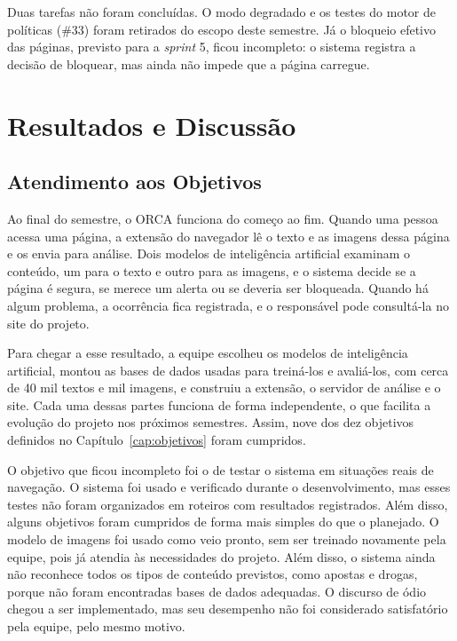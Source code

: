 \documentclass[
    12pt,           %
    oneside,        %
    a4paper,        %
    chapter=TITLE,  %
    english,        %
    brazil          %
]{abntex2}
\begin{document}
Duas tarefas não foram concluídas. O modo degradado e os testes do motor de
políticas (\#33) foram retirados do escopo deste semestre. Já o bloqueio
efetivo das páginas, previsto para a \textit{sprint} 5, ficou incompleto: o
sistema registra a decisão de bloquear, mas ainda não impede que a página
carregue.
\chapter{Resultados e Discussão}

\section{Atendimento aos Objetivos}

Ao final do semestre, o ORCA funciona do começo ao fim. Quando uma pessoa
acessa uma página, a extensão do navegador lê o texto e as imagens dessa
página e os envia para análise. Dois modelos de inteligência artificial
examinam o conteúdo, um para o texto e outro para as imagens, e o sistema
decide se a página é segura, se merece um alerta ou se deveria ser bloqueada.
Quando há algum problema, a ocorrência fica registrada, e o responsável pode
consultá-la no site do projeto.

Para chegar a esse resultado, a equipe escolheu os modelos de inteligência
artificial, montou as bases de dados usadas para treiná-los e avaliá-los, com
cerca de 40 mil textos e mil imagens, e construiu a extensão, o servidor de
análise e o site. Cada uma dessas partes funciona de forma independente, o que
facilita a evolução do projeto nos próximos semestres. Assim, nove dos dez
objetivos definidos no Capítulo~\ref{cap:objetivos} foram cumpridos.

O objetivo que ficou incompleto foi o de testar o sistema em situações reais
de navegação. O sistema foi usado e verificado durante o desenvolvimento, mas
esses testes não foram organizados em roteiros com resultados registrados.
Além disso, alguns objetivos foram cumpridos de forma mais simples do que o
planejado. O modelo de imagens foi usado como veio pronto, sem ser treinado
novamente pela equipe, pois já atendia às necessidades do projeto. Além disso,
o sistema ainda não reconhece todos os tipos de conteúdo previstos, como
apostas e drogas, porque não foram encontradas bases de dados adequadas. O
discurso de ódio chegou a ser implementado, mas seu desempenho não foi
considerado satisfatório pela equipe, pelo mesmo motivo.
\end{document}
